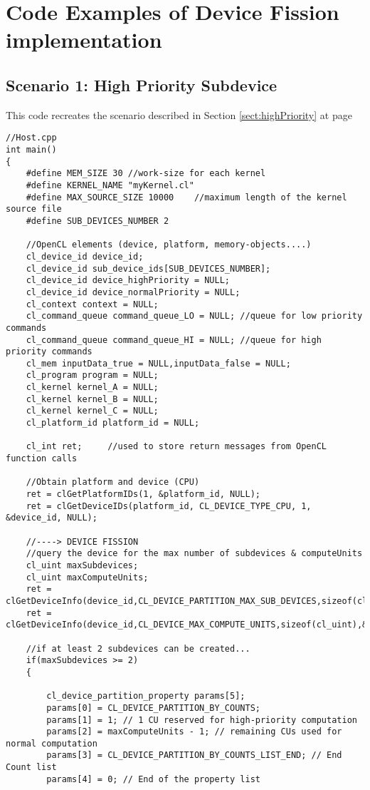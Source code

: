 \newpage
\section{Code Examples of Device Fission implementation}

\subsection{Scenario 1: High Priority Subdevice}

This code recreates the scenario described in Section \ref{sect:highPriority} at page \pageref{sect:highPriority}

{\scriptsize\begin{verbatim}
//Host.cpp
int main()
{
	#define MEM_SIZE 30 //work-size for each kernel
	#define KERNEL_NAME "myKernel.cl"
	#define MAX_SOURCE_SIZE 10000    //maximum length of the kernel source file
	#define SUB_DEVICES_NUMBER 2

	//OpenCL elements (device, platform, memory-objects....)
	cl_device_id device_id;
	cl_device_id sub_device_ids[SUB_DEVICES_NUMBER];
	cl_device_id device_highPriority = NULL;
	cl_device_id device_normalPriority = NULL;
	cl_context context = NULL;
	cl_command_queue command_queue_LO = NULL; //queue for low priority commands
	cl_command_queue command_queue_HI = NULL; //queue for high priority commands
	cl_mem inputData_true = NULL,inputData_false = NULL;
	cl_program program = NULL;
	cl_kernel kernel_A = NULL;
	cl_kernel kernel_B = NULL;
	cl_kernel kernel_C = NULL;
	cl_platform_id platform_id = NULL;
	
	cl_int ret;     //used to store return messages from OpenCL function calls
	
	//Obtain platform and device (CPU)
	ret = clGetPlatformIDs(1, &platform_id, NULL);
	ret = clGetDeviceIDs(platform_id, CL_DEVICE_TYPE_CPU, 1, &device_id, NULL);

	//----> DEVICE FISSION
	//query the device for the max number of subdevices & computeUnits
	cl_uint maxSubdevices;
	cl_uint maxComputeUnits;
	ret = clGetDeviceInfo(device_id,CL_DEVICE_PARTITION_MAX_SUB_DEVICES,sizeof(cl_uint),&maxSubdevices,NULL);
	ret = clGetDeviceInfo(device_id,CL_DEVICE_MAX_COMPUTE_UNITS,sizeof(cl_uint),&maxComputeUnits,NULL);
	
	//if at least 2 subdevices can be created...
	if(maxSubdevices >= 2)
	{

		cl_device_partition_property params[5];
		params[0] = CL_DEVICE_PARTITION_BY_COUNTS; 
		params[1] = 1; // 1 CU reserved for high-priority computation
		params[2] = maxComputeUnits - 1; // remaining CUs used for normal computation
		params[3] = CL_DEVICE_PARTITION_BY_COUNTS_LIST_END; // End Count list
		params[4] = 0; // End of the property list


\end{verbatim}}
